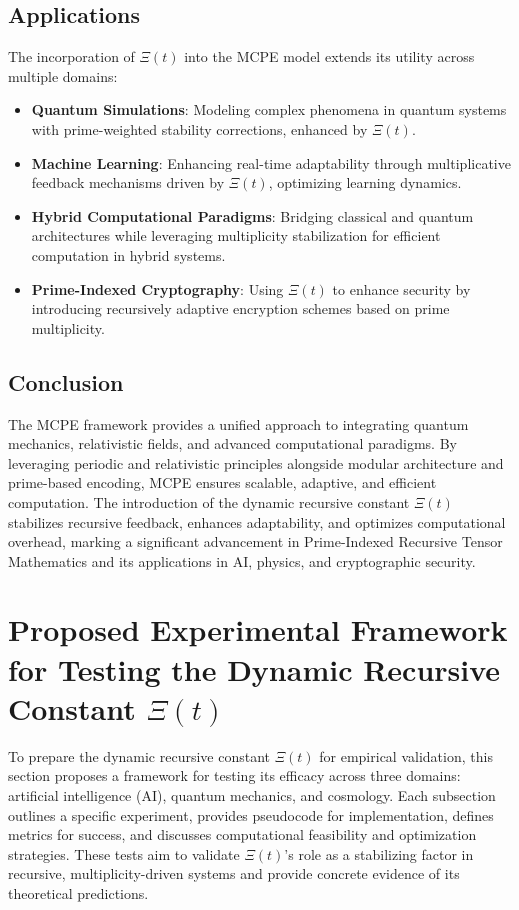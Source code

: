 \documentclass{article}
\theoremstyle{plain}
\begin{document}
\begin{itemize}
\subsection{Applications}
The incorporation of \(\Xi(t) \) into the MCPE model extends its utility across multiple domains:
\begin{itemize}
    \item \textbf{Quantum Simulations}: Modeling complex phenomena in quantum systems with prime-weighted stability corrections, enhanced by \(\Xi(t) \).
    \item \textbf{Machine Learning}: Enhancing real-time adaptability through multiplicative feedback mechanisms driven by \(\Xi(t) \), optimizing learning dynamics.
    \item \textbf{Hybrid Computational Paradigms}: Bridging classical and quantum architectures while leveraging multiplicity stabilization for efficient computation in hybrid systems.
    \item \textbf{Prime-Indexed Cryptography}: Using \(\Xi(t) \) to enhance security by introducing recursively adaptive encryption schemes based on prime multiplicity.
\end{itemize}

\subsection{Conclusion}
The MCPE framework provides a unified approach to integrating quantum mechanics, relativistic fields, and advanced computational paradigms. By leveraging periodic and relativistic principles alongside modular architecture and prime-based encoding, MCPE ensures scalable, adaptive, and efficient computation. The introduction of the dynamic recursive constant \(\Xi(t) \) stabilizes recursive feedback, enhances adaptability, and optimizes computational overhead, marking a significant advancement in Prime-Indexed Recursive Tensor Mathematics and its applications in AI, physics, and cryptographic security.
\section{Proposed Experimental Framework for Testing the Dynamic Recursive Constant \(\Xi(t) \)}
\label{sec:experimental_framework}

To prepare the dynamic recursive constant \(\Xi(t) \) for empirical validation, this section proposes a framework for testing its efficacy across three domains: artificial intelligence (AI), quantum mechanics, and cosmology. Each subsection outlines a specific experiment, provides pseudocode for implementation, defines metrics for success, and discusses computational feasibility and optimization strategies. These tests aim to validate \(\Xi(t) \)'s role as a stabilizing factor in recursive, multiplicity-driven systems and provide concrete evidence of its theoretical predictions.


\end{itemize}
\end{document}

